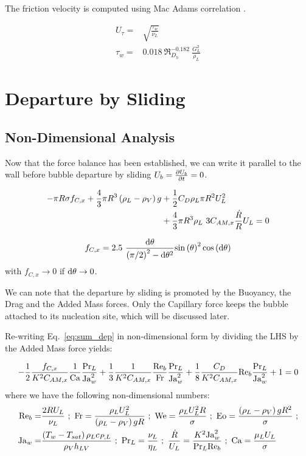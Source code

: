The friction velocity is computed using Mac Adams correlation \cite{mcadams_heat_1954}.

\begin{align}
U_{\tau} =& \sqrt{\frac{\tau_{w}}{\nu_{L}}}\\
\tau_{w} =& 0.018~ \Re_{D_{h}}^{-0.182}~ \frac{G_{L}^{2}}{\rho_{L}}
\end{align}

\section{Departure by Sliding}\label{sec:departure}

\subsection{Non-Dimensional Analysis}\label{subsec:adim_dep}

Now that the force balance has been established, we can write it parallel to the wall before bubble departure by sliding \ie $U_{b}=\frac{\partial{U_{b}}}{\partial t}=0$.

\begin{align}
\label{eq:sum_dep}
\nonumber - \pi R\sigma f_{C,x} + \frac{4}{3}\pi R^{3}\left( \rho_{L}-\rho_{V} \right)g &+ \frac{1}{2}C_{D}\rho_{L}\pi R^{2} U_{L}^{2} \\
& + \frac{4}{3}\pi R^{3}\rho_{L}~3C_{AM,x}\frac{\dot{R}}{R}U_{L} = 0
\end{align}

\begin{equation}
 f_{C,x}=2.5\ \frac{\mathrm{d}\theta}{\left( \pi/2 \right)^{2}-\mathrm{d}\theta^{2}}\mathrm{sin}\left( \theta \right)^{2}\mathrm{cos}\left( \mathrm{d}\theta \right)
\end{equation}
with $f_{C,x} \to 0 $ if $\mathrm{d}\theta \to 0$.


We can note that the departure by sliding is promoted by the Buoyancy, the Drag and the Added Mass forces. Only the Capillary force keeps the bubble attached to its nucleation site, which will be discussed later.


\npar
Re-writing Eq.~\ref{eq:sum_dep} in non-dimensional form by dividing the LHS by the Added Mass force yields:

\begin{equation}
\label{eq:adim_dep}
-\frac{1}{2}\frac{f_{C,x}}{K^{2}C_{AM,x}}\frac{1}{\mathrm{Ca}}\frac{\mathrm{Pr}_{L}}{\mathrm{Ja}_{w}^{2}} +  \frac{1}{3}\frac{1}{K^{2}C_{AM,x}}\frac{\mathrm{Re}_{b}}{\mathrm{Fr}}\frac{\mathrm{Pr}_{L}}{\mathrm{Ja}_{w}^{2}} + \frac{1}{8}\frac{C_{D}}{K^{2}C_{AM,x}}\mathrm{Re}_{b}\frac{\mathrm{Pr}_{L}}{\mathrm{Ja}_{w}^{2}} +1 =0
\end{equation}
where we have the following non-dimensional numbers:
\begin{align}
\nonumber \Re_{b} =& \frac{2RU_{L}}{\nu_{L}}\ ;\ \Fr=\frac{\rho_{L}U_{L}^{2}}{\parth{\rho_{L}-\rho_{V}}g R}\ ;\ \We=\frac{\rho_{L}U_{L}^{2}R}{\sigma}\ ; \ \Eo=\frac{\parth{\rho_{L}-\rho_{V}}g R^{2}}{\sigma}\ ;\\
%
\nonumber \Ja_{w}=&\frac{\parth{T_{w}-T_{sat}}\rho_{L} c_{P,L}}{\rho_{V} h_{LV}}\ ;\ \Pr_{L}=\frac{\nu_{L}}{\eta_{L}}\ ;\ \frac{\dot{R}}{U_{L}}=\frac{K^{2}\Ja_{w}^{2}}{\Pr_{L} \Re_{b}}\ ;\ \Ca=\frac{\mu_{L}U_{L}}{\sigma}
\end{align}


